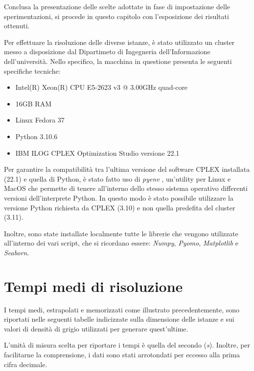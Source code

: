 Conclusa la presentazione delle scelte adottate in fase di impostazione delle sperimentazioni, 
si procede in questo capitolo con l'esposizione dei risultati ottenuti. 

Per effettuare la risoluzione delle diverse istanze, è stato utilizzato un cluster messo a disposizione dal Dipartimeto di Ingegneria dell'Informazione 
dell'università. Nello specifico, la macchina in questione presenta le seguenti specifiche tecniche:
\begin{itemize}
\item Intel(R) Xeon(R) CPU E5-2623 v3 @ 3.00GHz quad-core
\item 16GB RAM
\item Linux Fedora 37
\item Python 3.10.6
\item IBM ILOG CPLEX Optimization Studio versione 22.1
\end{itemize}
Per garantire la compatibilità tra l'ultima versione del software CPLEX installata (22.1) e quella di Python, è stato fatto uso di \textit{pyenv} \cite{pyenv}, 
un'utility per Linux e MacOS che permette di tenere all'interno dello stesso sistema operativo differenti versioni dell'interprete Python. In questo modo 
è stato possibile utilizzare la versione Python richiesta da CPLEX (3.10) e non quella predefita del cluster (3.11).

Inoltre, sono state installate localmente tutte le librerie che vengono utilizzate all'interno dei vari script, che si ricordano 
essere: \textit{Numpy}, \textit{Pyomo}, \textit{Matplotlib} e \textit{Seaborn}.

\newpage
\section{Tempi medi di risoluzione}
I tempi medi, estrapolati e memorizzati come illustrato precedentemente, sono riportati nelle seguenti tabelle indicizzate sulla dimensione delle istanze 
e sui valori di densità di grigio utilizzati per generare quest'ultime.

L'unità di misura scelta per riportare i tempi è quella del secondo (\textit{s}). Inoltre, per facilitarne la comprensione, i dati 
sono stati arrotondati per eccesso alla prima cifra decimale.
\\

